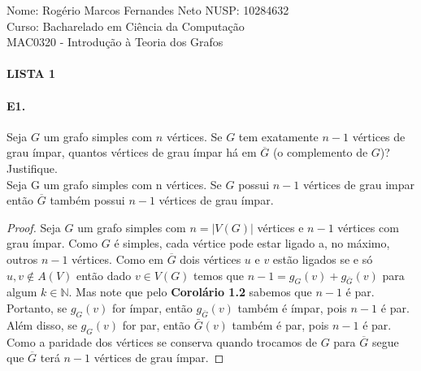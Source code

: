 \documentclass[11pt,a4paper,notitlepage]{exam}
\begin{document}
\begin{center}
Nome: Rogério Marcos Fernandes Neto\hphantom{xxx} NUSP: 10284632\\
Curso: Bacharelado em Ciência da Computação\\
MAC0320 - Introdução à Teoria dos Grafos
\paragraph{}
\textbf{LISTA 1}
\end{center}

\paragraph*{E1.} Seja $G$ um grafo simples com $n$ vértices. Se $G$ tem exatamente $n-1$ vértices de grau ímpar, quantos vértices de grau ímpar há em $\overline{G}$ (o complemento de $G$)? Justifique.\\

Seja G um grafo simples com n vértices. Se $G$ possui $n-1$ vértices de grau impar então $\overline{G}$ também possui $n-1$ vértices de grau ímpar.
\begin{proof}
  Seja $G$ um grafo simples com $n = |V(G)|$ vértices e $n-1$ vértices com grau ímpar. Como $G$ é simples, cada vértice pode estar ligado a, no máximo, outros $n-1$ vértices. Como em $\overline{G}$ dois vértices $u$ e $v$ estão ligados se e só ${u,v}\notin A(V)$ então dado $v \in V(G)$ temos que $n-1  = g_G(v) + g_{\bar{G}}(v)$ para algum $k \in \mathbb{N}$. Mas note que pelo \textbf{Corolário 1.2} sabemos que $n-1$ é par. Portanto, se $g_G(v)$ for ímpar, então $g_{\bar{G}}(v)$ também é ímpar, pois $n-1$ é par. Além disso, se $g_G(v)$ for par, então ${\bar{G}}(v)$ também é par, pois $n-1$ é par. Como a paridade dos vértices se conserva quando trocamos de $G$ para $\overline{G}$ segue que $\overline{G}$ terá $n-1$ vértices de grau ímpar.
\end{proof}
\end{document}
